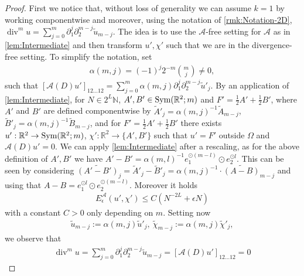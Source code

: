 \documentclass[a4paper, 10pt, twoside, notitlepage]{amsart}
\theoremstyle{plain}
\newcommand{\R}{\mathbb{R}}
\newcommand{\N}{\mathbb{N}}
\newcommand{\p}{\partial}
\newcommand{\A}{\mathcal{A}}
\DeclareMathOperator{\di}{div}
\begin{document}
                  \begin{proof}
                    First we notice that, without loss of generality we can assume $k=1$ by working componentwise and moreover, using the notation of \cref{rmk:Notation-2D}, $\di^m u = \sum_{j=0}^m \p_1^j \p_2^{m-j} \tilde{u}_{m-j}$.
                    The idea is to use the $\A$-free setting for $\A$ as in \cref{lem:Intermediate} and then transform $u',\chi'$ such that we are in the divergence-free setting.
                    To simplify the notation, set
                    \begin{align*}
                      \alpha(m,j) = (-1)^j 2^{-m} \binom{m}{j} \neq 0,
                    \end{align*}
                    such that $[\A(D)u']_{12\dots12} = \sum_{j=0}^m \alpha(m,j) \p_1^j \p_2^{m-j} \tilde{u}'_j$. 
                    By an application of \cref{lem:Intermediate}, for $N \in 2^L\N$, $A',B' \in \textup{Sym}(\R^2;m)$ and $F' = \frac{1}{2}A' + \frac{1}{2}B'$, where $A'$ and $B'$ are defined componentwise by $\tilde{A}'_j = \alpha(m,j)^{-1} \tilde{A}_{m-j}$, $\tilde{B}'_j = \alpha(m,j)^{-1} \tilde{B}_{m-j}$, and for $F' = \frac{1}{2}A' + \frac{1}{2}B'$ there exists $u':\R^2 \to \textup{Sym}(\R^2;m)$, $\chi':\R^2 \to \{A',B'\}$ such that $u' = F'$ outside $\Omega$ and $\A(D)u' = 0$.
                    We can apply \cref{lem:Intermediate} after a rescaling, as for the above definition of $A',B'$ we have $A'-B' = \alpha(m,l)^{-1} e_1^{\odot (m-l)} \odot e_2^{\odot l}$. This can be seen by considering $\widetilde{(A'-B')}_j = \tilde{A}'_j - \tilde{B}'_j= \alpha(m,j)^{-1} \cdot\widetilde{(A-B)}_{m-j}$ and using that $A-B = e_1^{\odot l} \odot e_2^{\odot (m-l)}$.
                    Moreover it holds 
                    \begin{align*}
                      E_\epsilon^{\A}(u',\chi') \leq C (N^{-2L} + \epsilon N)
                    \end{align*}
                    with a constant $C > 0$ only depending on $m$.
                    Setting now
                    \begin{align*}
                      \tilde{u}_{m-j} := \alpha(m,j)  \tilde{u}'_j, \ \tilde{\chi}_{m-j} := \alpha(m,j)  \tilde{\chi}'_j,
                    \end{align*}
                    we observe that
                    \begin{align*}
                      \di^m u = \sum_{j=0}^m \p_1^j \p_2^{m-j} \tilde{u}_{m-j} = [\A(D)u']_{12 \dots 12} = 0
                    \end{align*}

\end{proof}
\end{document}
